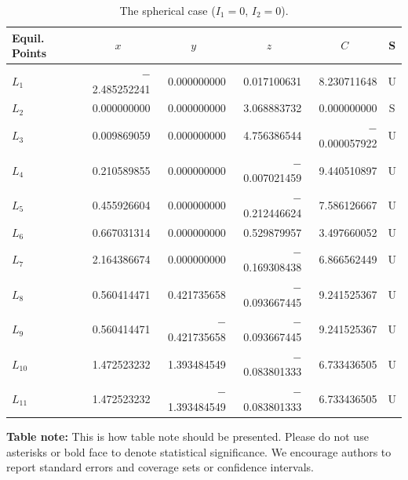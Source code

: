 \documentclass[qe,nameyear,draft]{econsocart}
\theoremstyle{plain}
\begin{document}
\begin{table}
\caption{The spherical case ($I_1=0$, $I_2=0$).}
\label{sphericcase}
\begin{tabular}{@{}lrrrrc@{}@{}}
\hline
Equil. Points
& \multicolumn{1}{c}{$x$}
& \multicolumn{1}{c}{$y$}
& \multicolumn{1}{c}{$z$}
& \multicolumn{1}{c}{$C$}
& S \\
\hline
$L_1$    & $-$2.485252241 & 0.000000000    & 0.017100631    & 8.230711648    & U \\
$L_2$    & 0.000000000    & 0.000000000    & 3.068883732    & 0.000000000    & S \\
$L_3$    & 0.009869059    & 0.000000000    & 4.756386544    & $-$0.000057922 & U \\
$L_4$    & 0.210589855    & 0.000000000    & $-$0.007021459 & 9.440510897    & U \\
$L_5$    & 0.455926604    & 0.000000000    & $-$0.212446624 & 7.586126667    & U \\
$L_6$    & 0.667031314    & 0.000000000    & 0.529879957    & 3.497660052    & U \\
$L_7$    & 2.164386674    & 0.000000000    & $-$0.169308438 & 6.866562449    & U \\
$L_8$    & 0.560414471    & 0.421735658    & $-$0.093667445 & 9.241525367    & U \\
$L_9$    & 0.560414471    & $-$0.421735658 & $-$0.093667445 & 9.241525367    & U \\
$L_{10}$ & 1.472523232    & 1.393484549    & $-$0.083801333 & 6.733436505    & U \\
$L_{11}$ & 1.472523232    & $-$1.393484549 & $-$0.083801333 & 6.733436505    & U \\
\hline
\end{tabular}
\end{table}
\textbf{Table note:} This is how table note should be presented.
Please do not use asterisks or bold face to denote statistical significance.
We encourage authors to report standard errors and coverage sets or confidence intervals.
\end{document}
